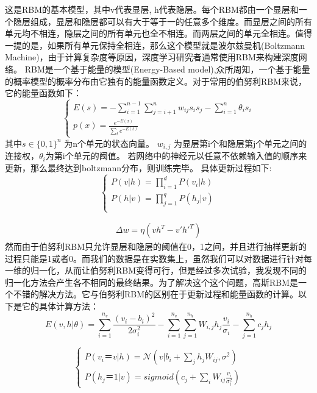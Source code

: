 	这是RBM的基本模型，其中v代表显层, h代表隐层。每个RBM都由一个显层和一个隐层组成，显层和隐层都可以有大于等于一的任意多个维度。而显层之间的所有单元均不相连，隐层之间的所有单元也全不相连。而两层之间的单元全相连。值得一提的是，如果所有单元保持全相连，那么这个模型就是波尔兹曼机(Boltzmann Machine)，由于计算复杂度等原因，深度学习研究者通常使用RBM来构建深度网络。
	RBM是一个基于能量的模型(Energy-Based model),众所周知，一个基于能量的概率模型的概率分布由它独有的能量函数定义。对于常用的伯努利RBM来说，它的能量函数如下：
	\begin{equation}
	\begin{cases}
	E(s) = -\sum\limits_{i=1}^{n-1}\sum\limits_{j = i + 1}^{n} w_{ij}s_is_j - \sum\limits_{i=1}^n \theta_i s_i \\
	p(x) = \frac{e^{-E(x)}}{\sum\limits_t e^{-E(t)}}
	\end{cases}
	\end{equation}
	其中$s \in \{0, 1\}^n$  为n个单元的状态向量。 $w_{i, j}$ 为显层第i个和隐层第j个单元之间的连接权，$\theta_i$为第i个单元的阈值。
	若网络中的神经元以任意不依赖输入值的顺序来更新，那么最终达到boltzmann分布，则训练完毕。
	具体更新过程如下:
	\begin{equation}
	\begin{cases}
	P(v|h) = \prod\limits_{i=1}^d P(v_i |h)\\
	P(h|v) = \prod\limits_{j=1}^q P(h_j |v)\\
	\end{cases}
	\end{equation}
	
	\begin{align}
	\Delta w = \eta(vh^T - v\prime {h\prime}^T)
	\end{align}
	然而由于伯努利RBM只允许显层和隐层的阈值在0，1之间，并且进行抽样更新的过程只能是1或者0。而我们的数据是在实数集上，虽然我们可以对数据进行针对每一维的归一化，从而让伯努利RBM变得可行，但是经过多次试验，我发现不同的归一化方法会产生各不相同的最终结果。为了解决这个这个问题，高斯RBM是一个不错的解决方法。它与伯努利RBM的区别在于更新过程和能量函数的计算。以下是它的具体计算方法：
	\begin{equation}
	E(v,h | \theta) = \sum\limits_{i=1}^{n_v}\frac{(v_i - b_i)^2}{2\sigma_i^2} - \sum\limits_{i=1}^{n_v}\sum\limits_{j=1}^{n_h} W_{i,j}h_j\frac{v_i}{\sigma_i} - \sum\limits_{j=1}^{n_h}c_jh_j
	\end{equation}
	
	\begin{equation}
	\begin{cases}
	P(v_i ＝ v|h) = \mathcal{N}(v | b_i + \sum\limits_{j}h_jW_{ij}, \sigma^2)\\
	P(h_j ＝ 1|v) = sigmoid(c_j + \sum\limits_i W_{ij} \frac{v_i}{\sigma_i^2})
	\end{cases}
	\end{equation}
	
